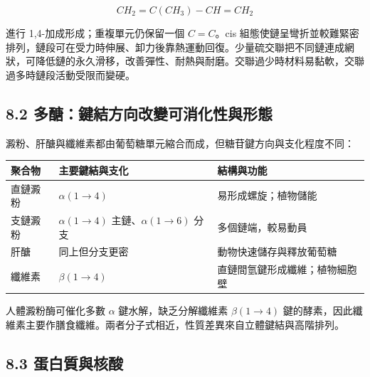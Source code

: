 \documentclass[11pt,a4paper]{article}
\newcounter{none}
\begin{document}
\[
CH_2=C(CH_3)-CH=CH_2
\]

進行 1,4-加成形成；重複單元仍保留一個 \(C=C\)。cis 組態使鏈呈彎折並較難緊密排列，鏈段可在受力時伸展、卸力後靠熱運動回復。少量硫交聯把不同鏈連成網狀，可降低鏈的永久滑移，改善彈性、耐熱與耐磨。交聯過少時材料易黏軟，交聯過多時鏈段活動受限而變硬。

\subsection{8.2 多醣：鍵結方向改變可消化性與形態}\label{ux591aux91a3ux9375ux7d50ux65b9ux5411ux6539ux8b8aux53efux6d88ux5316ux6027ux8207ux5f62ux614b}

澱粉、肝醣與纖維素都由葡萄糖單元縮合而成，但糖苷鍵方向與支化程度不同：

{\def\LTcaptype{none} %
\begin{longtable}[]{@{}
  >{\raggedright\arraybackslash}p{}
  >{\raggedright\arraybackslash}p{}
  >{\raggedright\arraybackslash}p{}@{}}
\toprule\noalign{}
\begin{minipage}[b]{\linewidth}\raggedright
聚合物
\end{minipage} & \begin{minipage}[b]{\linewidth}\raggedright
主要鍵結與支化
\end{minipage} & \begin{minipage}[b]{\linewidth}\raggedright
結構與功能
\end{minipage} \\
\midrule\noalign{}
\endhead
\bottomrule\noalign{}
\endlastfoot
直鏈澱粉 & \(\alpha(1\rightarrow4)\) & 易形成螺旋；植物儲能 \\
支鏈澱粉 & \(\alpha(1\rightarrow4)\) 主鏈、\(\alpha(1\rightarrow6)\) 分支 & 多個鏈端，較易動員 \\
肝醣 & 同上但分支更密 & 動物快速儲存與釋放葡萄糖 \\
纖維素 & \(\beta(1\rightarrow4)\) & 直鏈間氫鍵形成纖維；植物細胞壁 \\
\end{longtable}
}

人體澱粉酶可催化多數 \(\alpha\) 鍵水解，缺乏分解纖維素 \(\beta(1\rightarrow4)\) 鍵的酵素，因此纖維素主要作膳食纖維。兩者分子式相近，性質差異來自立體鍵結與高階排列。

\subsection{8.3 蛋白質與核酸}\label{ux86cbux767dux8ceaux8207ux6838ux9178}
\end{document}

